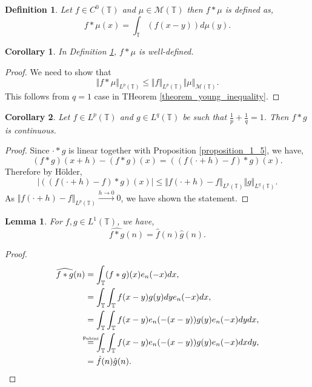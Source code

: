 \documentclass[8pt]{article}
\newtheorem{definition}{Definition}[section]
\newtheorem{lemma}{Lemma}[section]
\newtheorem{corollary}{Corollary} [section]
\newcommand{\ztext}[1]{\text{\makebox[0pt][c]{\tiny #1}}}
\newcommand{\norm}[1]{\Vert #1 \Vert}
\newcommand{\ab}[1]{\vert #1 \vert}
\newcommand{\bT}[0]{\mathbb{T}}
\newcommand{\cM}[0]{\mathcal{M}}
\begin{document}
\begin{definition}
  \label{definition_1_1}
  Let $f\in C^0(\bT)$ and $\mu\in\cM(\bT)$ then $f\ast\mu$ is defined as,
  \begin{equation*}
    f\ast\mu(x) = \int_{\bT}(f(x-y))d\mu(y).
  \end{equation*}
\end{definition}

\begin{corollary}
  \label{corollary_1_1}
  In Definition \ref{definition_1_1}, $f\ast\mu$ is well-defined. 
\end{corollary}

\begin{proof}
  We need to show that 
  \begin{equation*}
    \norm{f\ast \mu}_{L^p(\bT)} \leq \norm{f}_{L^p(\bT)}\norm{\mu}_{\cM(\bT)}.
  \end{equation*}
  This follows from $q=1$ case in THeorem \ref{theorem_young_inequality}.
\end{proof}

\begin{corollary}
  Let $f\in L^p(\bT)$ and $g\in L^q(\bT)$ be such that ${\frac 1 p}+{\frac 1 q} = 1$. Then $f\ast g$ is continuous.
\end{corollary}

\begin{proof}
  Since $\cdot\ast g$ is linear together with Proposition \ref{proposition_1_5}, we have,
  \begin{equation*}
    (f\ast g)(x+h)-(f\ast g)(x) = ((f(\cdot +h)-f)\ast g)(x).
  \end{equation*}
  Therefore by Hölder,
  \begin{equation*}
    \ab{((f(\cdot +h)-f)\ast g)(x)}\leq \norm{f(\cdot+h)-f}_{L^p(\bT)}\norm{g}_{L^q(\bT)}.
  \end{equation*}
  As $\norm{f(\cdot+h)-f}_{L^p(\bT)}\stackrel{h\to0}{\to}0$, we have shown the statement.
\end{proof}

\begin{lemma}
  \label{lemma_1_1}
  For $f,g\in L^1(\bT)$, we have,
  \begin{equation*}
    \widehat{f\ast g}(n) = \hat{f}(n)\hat{g}(n).
  \end{equation*}
\end{lemma}
\begin{proof}
  \begin{align*}
    \widehat{f\ast g}(n) & = \int_{\bT}(f\ast g)(x)e_n(-x)dx,\\
    &= \int_\bT\int_\bT f(x-y)g(y)dy e_n(-x)dx,\\
    & = \int_\bT\int_\bT f(x-y)e_n(-(x-y))g(y)e_n(-x)dydx,\\
    &\stackrel{\ztext{Fubini}}{=}\int_\bT\int_\bT f(x-y)e_n(-(x-y))g(y)e_n(-x)dxdy,\\
    & = \hat{f}(n)\hat{g}(n).
  \end{align*}
\end{proof}
\end{document}
